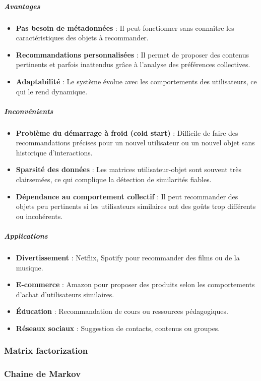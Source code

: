 \documentclass{article}
\begin{document}
    \subparagraph{Avantages}
    \begin{itemize}
        \item \textbf{Pas besoin de métadonnées} : Il peut fonctionner sans connaître les caractéristiques des objets à recommander.
        \item \textbf{Recommandations personnalisées} : Il permet de proposer des contenus pertinents et parfois inattendus grâce à l’analyse des préférences collectives.
        \item \textbf{Adaptabilité} : Le système évolue avec les comportements des utilisateurs, ce qui le rend dynamique.
    \end{itemize}

    \subparagraph{Inconvénients}
    \begin{itemize}
        \item \textbf{Problème du démarrage à froid (cold start)} : Difficile de faire des recommandations précises pour un nouvel utilisateur ou un nouvel objet sans historique d'interactions.
        \item \textbf{Sparsité des données} : Les matrices utilisateur-objet sont souvent très clairsemées, ce qui complique la détection de similarités fiables.
        \item \textbf{Dépendance au comportement collectif} : Il peut recommander des objets peu pertinents si les utilisateurs similaires ont des goûts trop différents ou incohérents.
    \end{itemize}

    \subparagraph{Applications}
    \begin{itemize}
        \item \textbf{Divertissement} : Netflix, Spotify pour recommander des films ou de la musique.
        \item \textbf{E-commerce} : Amazon pour proposer des produits selon les comportements d’achat d’utilisateurs similaires.
        \item \textbf{Éducation} : Recommandation de cours ou ressources pédagogiques.
        \item \textbf{Réseaux sociaux} : Suggestion de contacts, contenus ou groupes.
    \end{itemize}

    \subsubsection{Matrix factorization}
    \subsubsection{Chaine de Markov}
\end{document}
